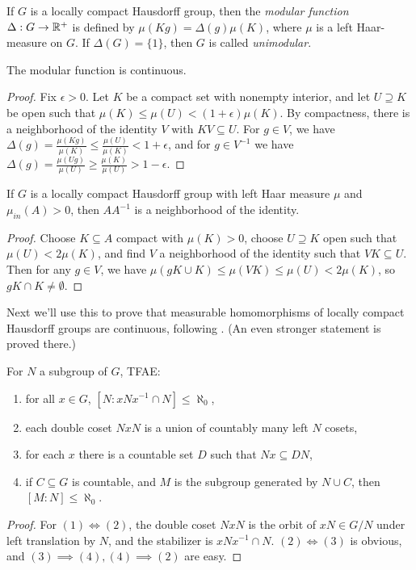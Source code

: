 \begin{defn} If $G$ is a locally compact Hausdorff group, then the \emph{modular function} $\Delta : G \rightarrow \mathbb{R}^+$ is defined by $\mu(Kg) = \Delta(g)\mu(K)$, where $\mu$ is a left Haar-measure on $G$. If $\Delta(G) = \{1\}$, then $G$ is called \emph{unimodular}.
\end{defn}

\begin{prop} The modular function is continuous.
\end{prop}
\begin{proof} Fix $\epsilon > 0$. Let $K$ be a compact set with nonempty interior, and let $U \supseteq K$ be open such that $\mu(K) \le \mu(U) < (1+\epsilon)\mu(K)$. By compactness, there is a neighborhood of the identity $V$ with $KV \subseteq U$. For $g \in V$, we have $\Delta(g) = \frac{\mu(Kg)}{\mu(K)} \le \frac{\mu(U)}{\mu(K)} < 1 + \epsilon$, and for $g \in V^{-1}$ we have $\Delta(g) = \frac{\mu(Ug)}{\mu(U)} \ge \frac{\mu(K)}{\mu(U)} > 1-\epsilon$.
\end{proof}

\begin{prop}\label{big-difference} If $G$ is a locally compact Hausdorff group with left Haar measure $\mu$ and $\mu_{in}(A) > 0$, then $AA^{-1}$ is a neighborhood of the identity.
\end{prop}
\begin{proof} Choose $K \subseteq A$ compact with $\mu(K) > 0$, choose $U \supseteq K$ open such that $\mu(U) < 2\mu(K)$, and find $V$ a neighborhood of the identity such that $VK \subseteq U$. Then for any $g \in V$, we have $\mu(gK\cup K) \le \mu(VK) \le \mu(U) < 2\mu(K)$, so $gK \cap K \ne \emptyset$.
\end{proof}

Next we'll use this to prove that measurable homomorphisms of locally compact Hausdorff groups are continuous, following \cite{kleppner-measurable}. (An even stronger statement is proved there.)

\begin{lem}\label{asoo} For $N$ a subgroup of $G$, TFAE:
\begin{enumerate}
\item for all $x \in G$, $[N:xNx^{-1}\cap N] \le \aleph_0$,

\item each double coset $NxN$ is a union of countably many left $N$ cosets,

\item for each $x$ there is a countable set $D$ such that $Nx \subseteq DN$,

\item if $C \subseteq G$ is countable, and $M$ is the subgroup generated by $N \cup C$, then $[M:N] \le \aleph_0$.
\end{enumerate}
\end{lem}
\begin{proof} For $(1) \iff (2)$, the double coset $NxN$ is the orbit of $xN \in G/N$ under left translation by $N$, and the stabilizer is $xNx^{-1} \cap N$. $(2) \iff (3)$ is obvious, and $(3) \implies (4), (4) \implies (2)$ are easy.
\end{proof}


